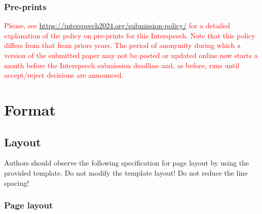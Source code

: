 \documentclass{Interspeech2024}
\newcommand{\red}[1]{\textcolor{red}{#1}}
\begin{document}
\subsubsection{Pre-prints}
\label{section:preprints}

\red{Please, see \url{https://interspeech2024.org/submission-policy/} for a detailed explanation of the policy on pre-prints for this Interspeech. Note that this policy differs from that from priors years. The period of anonymity during which a version of the submitted paper may not be posted or updated online now starts a month before the Interspeech submission deadline and, as before, runs until accept/reject decisions are announced.}



\section{Format}

\subsection{Layout}

Authors should observe the following specification for page layout by using the provided template. Do not modify the template layout! Do not reduce the line spacing!

\subsubsection{Page layout}
\end{document}
